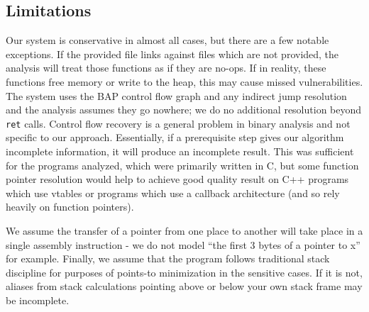 \subsection{Limitations}
Our system is conservative in almost all cases, but there are a few notable exceptions.
If the provided file links against files which are not provided, the analysis will treat those functions as if they are no-ops.
If in reality, these functions free memory or write to the heap, this may cause missed vulnerabilities.
The system uses the BAP control flow graph and any indirect jump resolution and the analysis assumes they go nowhere; we do no additional resolution beyond \texttt{ret} calls.
Control flow recovery is a general problem in binary analysis and not specific to our approach.
Essentially, if a prerequisite step gives our algorithm incomplete information, it will produce an incomplete result.
This was sufficient for the programs analyzed, which were primarily written in C, but some function pointer resolution would help to achieve good quality result on C++ programs which use vtables or programs which use a callback architecture (and so rely heavily on function pointers).

We assume the transfer of a pointer from one place to another will take place in a single assembly instruction - we do not model ``the first 3 bytes of a pointer to x'' for example.
Finally, we assume that the program follows traditional stack discipline for purposes of points-to minimization in the sensitive cases.
If it is not, aliases from stack calculations pointing above or below your own stack frame may be incomplete.
